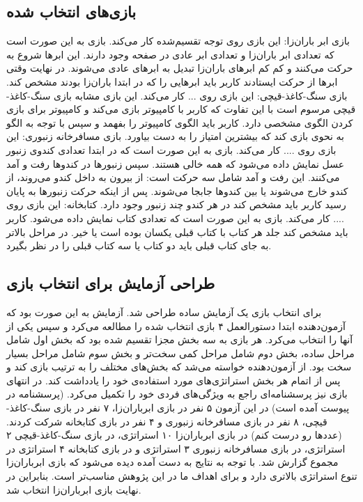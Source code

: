 \documentclass[twoside, a4paper,11pt]{book}
\numberwithin{equation}{chapter}
\numberwithin{table}{chapter}
\numberwithin{figure}{chapter}
\numberwithin{equation}{chapter}
\begin{document}
\subsection{بازی‌های انتخاب شده}
بازی ابر باران‌زا: این بازی روی توجه تقسیم‌شده کار می‌کند. بازی به این صورت است که تعدادی ابر باران‌زا و تعدادی ابر عادی در صفحه وجود دارند. این ابرها شروع به حرکت می‌کنند و کم کم ابرهای باران‌زا تبدیل به ابرهای عادی می‌شوند. در نهایت وقتی ابرها از حرکت ایستادند کاربر باید ابرهایی را که در ابتدا باران‌زا بودند مشخص کند.
بازی سنگ-کاغذ-قیچی: این بازی روی ... کار می‌کند. این بازی مشابه بازی سنگ-کاغذ-قیچی مرسوم است با این تفاوت که کاربر با کامپیوتر بازی می‌کند و کامپیوتر برای بازی کردن الگوی مشخصی دارد. کاربر باید الگوی کامپیوتر را بفهمد و سپس با توجه به الگو به نحوی بازی کند که بیشترین امتیاز را به دست بیاورد.
بازی مسافرخانه زنبوری: این بازی روی .... کار می‌کند. بازی به این صورت است که در ابتدا تعدادی کندوی زنبور عسل نمایش داده می‌شود که همه خالی هستند. سپس زنبورها در کندوها رفت و آمد می‌کنند. این رفت و آمد شامل سه حرکت است: از بیرون به داخل کندو می‌روند، از کندو خارج می‌شوند یا بین کندوها جابجا می‌شوند. پس از اینکه حرکت زنبورها به پایان رسید کاربر باید مشخص کند در هر کندو چند زنبور وجود دارد.
کتابخانه: این بازی روی .... کار می‌کند. بازی به این صورت است که تعدادی کتاب نمایش داده می‌شود. کاربر باید مشخص کند جلد هر کتاب با کتاب قبلی یکسان بوده است یا خیر. در مراحل بالاتر به جای کتاب قبلی باید دو کتاب یا سه کتاب قبلی را در نظر بگیرد.

\subsection{طراحی آزمایش برای انتخاب بازی}
برای انتخاب بازی یک آزمایش ساده طراحی شد. آزمایش به این صورت بود که آزمون‌دهنده ابتدا دستورالعمل ۴ بازی انتخاب شده را مطالعه می‌کرد و سپس یکی از آنها را انتخاب می‌کرد. هر بازی به سه بخش مجزا تقسیم شده بود که بخش اول شامل مراحل ساده، بخش دوم شامل مراحل کمی سخت‌تر و بخش سوم شامل مراحل بسیار سخت بود. از آزمون‌دهنده خواسته می‌شد که بخش‌های مختلف را به ترتیب بازی کند و پس از اتمام هر بخش استراتژی‌های مورد استفاده‌ی خود را یادداشت کند. در انتهای بازی نیز پرسشنامه‌ای راجع به ویژگی‌های فردی خود را تکمیل می‌کرد. (پرسشنامه در پیوست آمده است)
در این آزمون ۵ نفر در بازی ابرباران‌زا، ۷ نفر در بازی سنگ-کاغذ-قیچی، ۸ نفر در بازی مسافرخانه زنبوری و ۴ نفر در بازی کتابخانه شرکت کردند. (عددها رو درست کنم) در بازی ابرباران‌زا ۱۰ استراتژی، در بازی سنگ-کاغذ-قیچی ۲ استراتژی، در بازی مسافرخانه زنبوری ۳ استراتژی و در بازی کتابخانه ۴ استراتژی در مجموع گزارش شد. با توجه به نتایج به دست آمده دیده می‌شود که بازی ابرباران‌زا تنوع استراتژی بالاتری دارد و برای اهداف ما در این پژوهش مناسب‌تر است. بنابراین در نهایت بازی ابرباران‌زا انتخاب شد.
\end{document}
